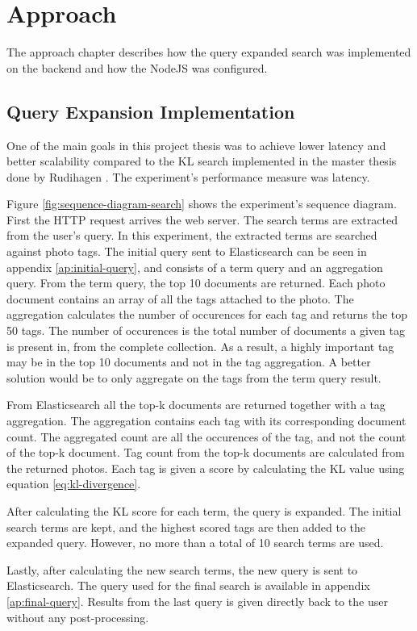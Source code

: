 \chapter{Approach}
\label{ch:approach}
The approach chapter describes how the query expanded search was implemented on the backend and how the NodeJS was configured.

\section{Query Expansion Implementation}
One of the main goals in this project thesis was to achieve lower latency and better scalability compared to the KL search implemented in the master thesis done by Rudihagen \cite{master-thesis}.
The experiment's performance measure was latency.

Figure \ref{fig:sequence-diagram-search} shows the experiment's sequence diagram.
First the HTTP request arrives the web server.
The search terms are extracted from the user's query.
In this experiment, the extracted terms are searched against photo tags.
The initial query sent to Elasticsearch can be seen in appendix \ref{ap:initial-query},
and consists of a term query and an aggregation query.
From the term query, the top 10 documents are returned.
Each photo document contains an array of all the tags attached to the photo.
The aggregation calculates the number of occurences for each tag and returns the top 50 tags.
The number of occurences is the total number of documents a given tag is present in, from the complete collection.
As a result, a highly important tag may be in the top 10 documents and not in the tag aggregation.
A better solution would be to only aggregate on the tags from the term query result.

From Elasticsearch all the top-k documents are returned together with a tag aggregation.
The aggregation contains each tag with its corresponding document count.
The aggregated count are all the occurences of the tag, and not the count of the top-k document.
Tag count from the top-k documents are calculated from the returned photos.
Each tag is given a score by calculating the KL value using equation \ref{eq:kl-divergence}.

After calculating the KL score for each term, the query is expanded.
The initial search terms are kept, and the highest scored tags are then added to the expanded query.
However, no more than a total of 10 search terms are used.

Lastly, after calculating the new search terms, the new query is sent to Elasticsearch.
The query used for the final search is available in appendix \ref{ap:final-query}.
Results from the last query is given directly back to the user without any post-processing.

